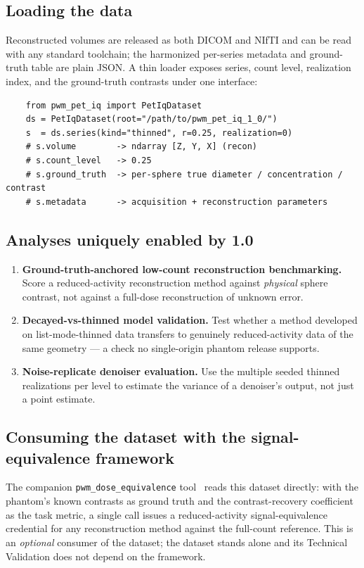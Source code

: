 \documentclass[twoside,11pt]{article}
\begin{document}
\subsection*{Loading the data}

Reconstructed volumes are released as both DICOM and NIfTI and can be read with any
standard toolchain; the harmonized per-series metadata and ground-truth table are
plain JSON. A thin loader exposes series, count level, realization index, and the
ground-truth contrasts under one interface:

\begin{verbatim}
    from pwm_pet_iq import PetIqDataset
    ds = PetIqDataset(root="/path/to/pwm_pet_iq_1_0/")
    s  = ds.series(kind="thinned", r=0.25, realization=0)
    # s.volume        -> ndarray [Z, Y, X] (recon)
    # s.count_level   -> 0.25
    # s.ground_truth  -> per-sphere true diameter / concentration / contrast
    # s.metadata      -> acquisition + reconstruction parameters
\end{verbatim}

\subsection*{Analyses uniquely enabled by 1.0}

\begin{enumerate}
    \item \textbf{Ground-truth-anchored low-count reconstruction benchmarking.}
    Score a reduced-activity reconstruction method against \emph{physical} sphere
    contrast, not against a full-dose reconstruction of unknown error.
    \item \textbf{Decayed-vs-thinned model validation.} Test whether a method
    developed on list-mode-thinned data transfers to genuinely reduced-activity data
    of the same geometry --- a check no single-origin phantom release supports.
    \item \textbf{Noise-replicate denoiser evaluation.} Use the multiple seeded
    thinned realizations per level to estimate the variance of a denoiser's output,
    not just a point estimate.
\end{enumerate}

\subsection*{Consuming the dataset with the signal-equivalence framework}

The companion \texttt{pwm\_dose\_equivalence} tool~\citep{ws2framework} reads this
dataset directly: with the phantom's known contrasts as ground truth and the
contrast-recovery coefficient as the task metric, a single call issues a
reduced-activity signal-equivalence credential for any reconstruction method against
the full-count reference. This is an \emph{optional} consumer of the dataset; the
dataset stands alone and its Technical Validation does not depend on the framework.
\end{document}
